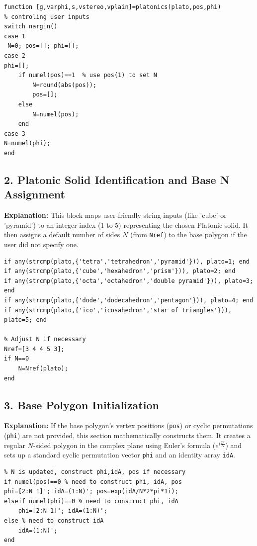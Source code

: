 \begin{lstlisting}
function [g,varphi,s,vstereo,vplain]=platonics(plato,pos,phi)
% controling user inputs
switch nargin()
case 1
 N=0; pos=[]; phi=[];
case 2
phi=[];
    if numel(pos)==1  % use pos(1) to set N
        N=round(abs(pos)); 
        pos=[];
    else
        N=numel(pos);
    end
case 3
N=numel(phi);
end
\end{lstlisting}

\subsection{2. Platonic Solid Identification and Base N Assignment}
\textbf{Explanation:} 
This block maps user-friendly string inputs (like 'cube' or 'pyramid') to an integer index (1 to 5) representing the chosen Platonic solid. It then assigns a default number of sides $N$ (from \texttt{Nref}) to the base polygon if the user did not specify one. 

\begin{lstlisting}
if any(strcmp(plato,{'tetra','tetrahedron','pyramid'})), plato=1; end
if any(strcmp(plato,{'cube','hexahedron','prism'})), plato=2; end
if any(strcmp(plato,{'octa','octahedron','double pyramid'})), plato=3; end
if any(strcmp(plato,{'dode','dodecahedron','pentagon'})), plato=4; end
if any(strcmp(plato,{'ico','icosahedron','star of triangles'})), plato=5; end

% Adjust N if necessary
Nref=[3 4 4 5 3];
if N==0 
    N=Nref(plato);
end
\end{lstlisting}

\subsection{3. Base Polygon Initialization}
\textbf{Explanation:} 
If the base polygon's vertex positions (\texttt{pos}) or cyclic permutations (\texttt{phi}) are not provided, this section mathematically constructs them. It creates a regular $N$-sided polygon in the complex plane using Euler's formula ($e^{i \frac{2\pi}{N}}$) and sets up a standard cyclic permutation vector \texttt{phi} and an identity array \texttt{idA}.

\begin{lstlisting}
% N is updated, construct phi,idA, pos if necessary
if numel(pos)==0 % need to construct phi, idA, pos
phi=[2:N 1]'; idA=(1:N)'; pos=exp(idA/N*2*pi*1i); 
elseif numel(phi)==0 % need to construct phi, idA
    phi=[2:N 1]'; idA=(1:N)'; 
else % need to construct idA
    idA=(1:N)';
end
\end{lstlisting}

